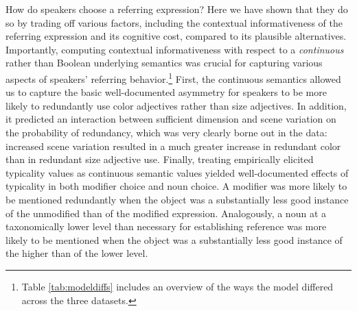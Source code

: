 \documentclass[11pt]{article}
\newcommand{\tableref}[1]{Table \ref{#1}}
\begin{document}
How do speakers choose a referring expression? Here we have shown that they do so by trading off various factors, including the contextual informativeness of the referring expression and its cognitive cost, compared to its plausible alternatives. Importantly, computing contextual informativeness with respect to a \emph{continuous} rather than Boolean underlying semantics was crucial for capturing various aspects of speakers' referring behavior.\footnote{\tableref{tab:modeldiffs} includes an overview of the ways the model differed across the three datasets.} First, the continuous semantics allowed us to capture the basic well-documented asymmetry for speakers to be more likely to redundantly use color adjectives rather than size adjectives. In addition, it predicted an interaction between sufficient dimension and scene variation on the probability of redundancy, which was very clearly borne out in the data: increased scene variation resulted in a much greater increase in redundant color than in redundant size adjective use. Finally, treating empirically elicited typicality values as continuous semantic values yielded well-documented effects of typicality in both modifier choice and noun choice. A modifier was more likely to be mentioned redundantly when the object was a substantially less good instance of the unmodified than of the modified expression. Analogously, a noun at a taxonomically lower level than necessary for establishing reference was more likely to be mentioned when the object was a substantially less good instance of the higher than of the lower level. 
\end{document}

